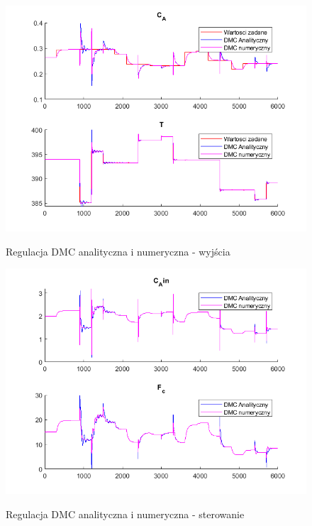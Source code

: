 \begin{figure}[h!]
	\centering
	\includegraphics[width=.7\linewidth]{img/yComparedDMC.png}
	\label{ch2:dmcster}
	\caption{Regulacja DMC analityczna i numeryczna - wyjścia}
\end{figure}
\begin{figure}[h!]
	\centering
	\includegraphics[width=.7\linewidth]{img/uComparedDMC.png}
	\label{ch2:dmc}
	\caption{Regulacja DMC analityczna i numeryczna - sterowanie}
\end{figure}

